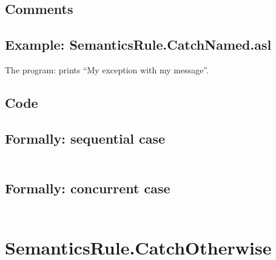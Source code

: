 \documentclass{book}
\begin{document}
    \subsection{Comments}

    \subsection{Example: SemanticsRule.CatchNamed.asl}
    The program:
    prints ``My exception with my message''.

  \subsection{Code}

  \subsection{Formally: sequential case}
  \begin{align}
  \end{align} 

  \subsection{Formally: concurrent case}
  \begin{align}
  \end{align} 

\section{SemanticsRule.CatchOtherwise \label{sec:SemanticsRule.CatchOtherwise}}
\end{document}
